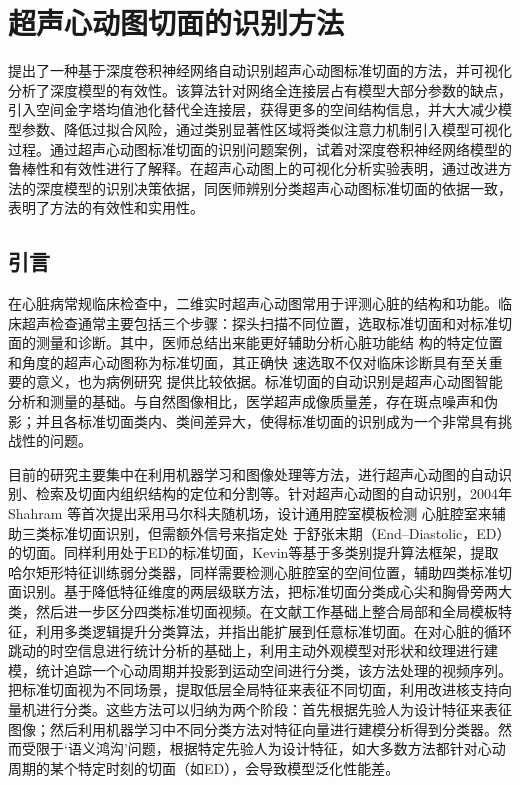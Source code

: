 
\chapter{超声心动图切面的识别方法}
\label{chap:classification}

 提出了一种基于深度卷积神经网络自动识别超声心动图标准切面的方法，并可视化分析了深度模型的有效性。该算法针对网络全连接层占有模型大部分参数的缺点，引入空间金字塔均值池化替代全连接层，获得更多的空间结构信息，并大大减少模型参数、降低过拟合风险，通过类别显著性区域将类似注意力机制引入模型可视化过程。通过超声心动图标准切面的识别问题案例，试着对深度卷积神经网络模型的鲁棒性和有效性进行了解释。在超声心动图上的可视化分析实验表明，通过改进方法的深度模型的识别决策依据，同医师辨别分类超声心动图标准切面的依据一致，表明了方法的有效性和实用性。

\section{引言}

在心脏病常规临床检查中，二维实时超声心动图常用于评测心脏的结构和功能。临床超声检查通常主要包括三个步骤：探头扫描不同位置，选取标准切面和对标准切面的测量和诊断\citep{Chen2015}。其中，医师总结出来能更好辅助分析心脏功能结 构的特定位置和角度的超声心动图称为标准切面，其正确快 速选取不仅对临床诊断具有至关重要的意义，也为病例研究 提供比较依据。标准切面的自动识别是超声心动图智能分析和测量的基础。与自然图像相比，医学超声成像质量差，存在斑点噪声和伪影；并且各标准切面类内、类间差异大，使得标准切面的识别成为一个非常具有挑战性的问题。 

目前的研究主要集中在利用机器学习和图像处理等方法，进行超声心动图的自动识别、检索及切面内组织结构的定位和分割等。针对超声心动图的自动识别，2004年Shahram 等\citep{Ebadollahi2004}首次提出采用马尔科夫随机场，设计通用腔室模板检测 心脏腔室来辅助三类标准切面识别，但需额外信号来指定处 于舒张末期（End–Diastolic，ED）的切面。同样利用处于ED的标准切面，Kevin等\citep{KevinZhou2006}基于多类别提升算法框架，提取哈尔矩形特征训练弱分类器，同样需要检测心脏腔室的空间位置，辅助四类标准切面识别。基于降低特征维度的两层级联方法，把标准切面分类成心尖和胸骨旁两大类，然后进一步区分四类标准切面视频\citep{Otey2006,Roy2006b}。在文献工作基础上整合局部和全局模板特征，利用多类逻辑提升分类算法，并指出能扩展到任意标准切面\citep{Park2007a}。在对心脏的循环跳动的时空信息进行统计分析的基础上，利用主动外观模型对形状和纹理进行建模，统计追踪一个心动周期并投影到运动空间进行分类\citep{Beymer2008}，该方法处理的视频序列。把标准切面视为不同场景，提取低层全局特征来表征不同切面，利用改进核支持向量机进行分类\citep{Wu2014c}。这些方法可以归纳为两个阶段：首先根据先验人为设计特征来表征图像；然后利用机器学习中不同分类方法对特征向量进行建模分析得到分类器。然而受限于‘语义鸿沟’问题，根据特定先验人为设计特征，如大多数方法都针对心动周期的某个特定时刻的切面（如ED），会导致模型泛化性能差。

